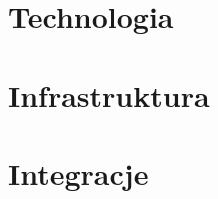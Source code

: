 




\section{Technologia}
\label{sec:technologia}


\section{Infrastruktura}
\label{sec:infrastruktura}


\section{Integracje}
\label{sec:integracje}







